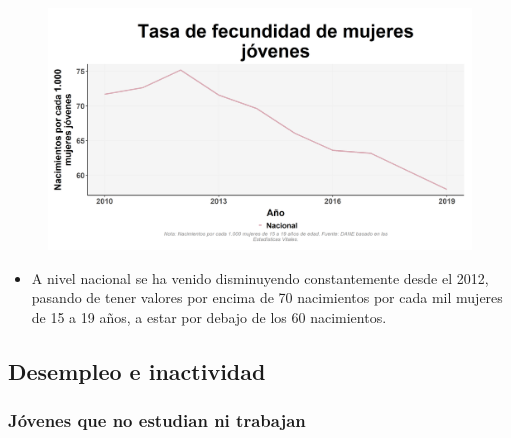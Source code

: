     \begin{figure}[H]
        \caption[Tasa de fecundidad en mujeres jóvenes a nivel nacional ]{\label{fecundjov_nal_trend} }
        \begin{center}
        \includegraphics[width=\textwidth,keepaspectratio]{img/var_283_trend.png}
        \end{center}
    \end{figure}
            \begin{itemize}
                \item A nivel nacional se ha venido disminuyendo constantemente desde el 2012, pasando de tener valores por encima de 70 nacimientos por cada mil mujeres de 15 a 19 años, a estar por debajo de los 60 nacimientos.
                \end{itemize}

    \subsection{Desempleo e inactividad}
        \subsubsection{Jóvenes que no estudian ni trabajan}

